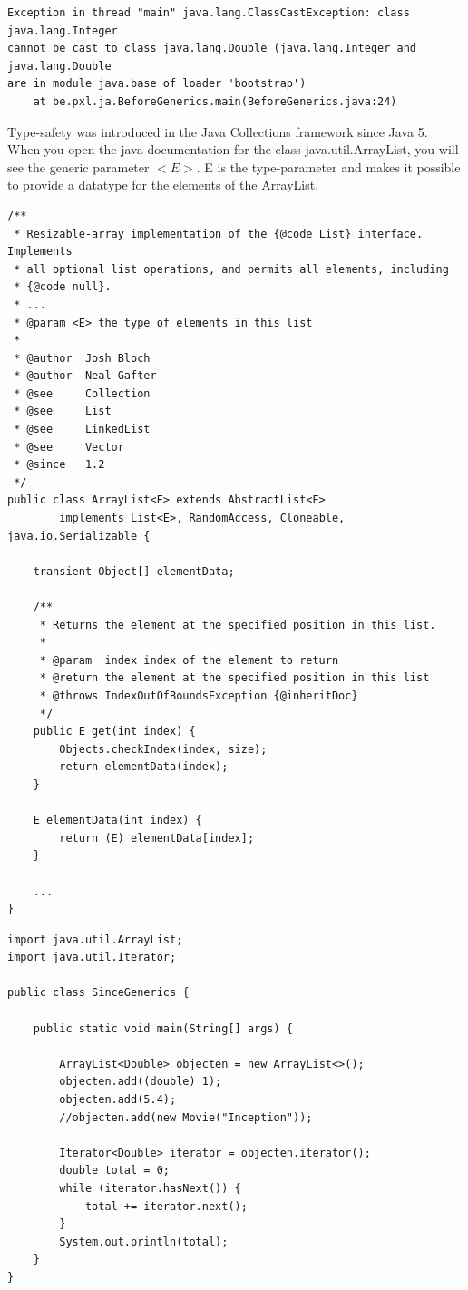\begin{verbatim}
Exception in thread "main" java.lang.ClassCastException: class java.lang.Integer 
cannot be cast to class java.lang.Double (java.lang.Integer and java.lang.Double 
are in module java.base of loader 'bootstrap')
	at be.pxl.ja.BeforeGenerics.main(BeforeGenerics.java:24)
\end{verbatim}

Type-safety was introduced in the Java Collections framework since Java 5. 
When you open the java documentation for the class java.util.ArrayList, you will see the generic parameter  $<E>$. 
E is the type-parameter and makes it possible to provide a datatype for the elements of the ArrayList. 

\begin{lstlisting}
/**
 * Resizable-array implementation of the {@code List} interface.  Implements
 * all optional list operations, and permits all elements, including
 * {@code null}. 
 * ...
 * @param <E> the type of elements in this list
 *
 * @author  Josh Bloch
 * @author  Neal Gafter
 * @see     Collection
 * @see     List
 * @see     LinkedList
 * @see     Vector
 * @since   1.2
 */
public class ArrayList<E> extends AbstractList<E>
        implements List<E>, RandomAccess, Cloneable, java.io.Serializable {
        
    transient Object[] elementData;
    
    /**
     * Returns the element at the specified position in this list.
     *
     * @param  index index of the element to return
     * @return the element at the specified position in this list
     * @throws IndexOutOfBoundsException {@inheritDoc}
     */
    public E get(int index) {
        Objects.checkIndex(index, size);
        return elementData(index);
    }
    
    E elementData(int index) {
        return (E) elementData[index];
    }
    
    ...
}
\end{lstlisting}

\begin{lstlisting}
import java.util.ArrayList;
import java.util.Iterator;

public class SinceGenerics {

	public static void main(String[] args) {

		ArrayList<Double> objecten = new ArrayList<>();
		objecten.add((double) 1);
		objecten.add(5.4);
		//objecten.add(new Movie("Inception"));

		Iterator<Double> iterator = objecten.iterator();
		double total = 0;
		while (iterator.hasNext()) {
			total += iterator.next();
		}
		System.out.println(total);
	}
}
\end{lstlisting}

